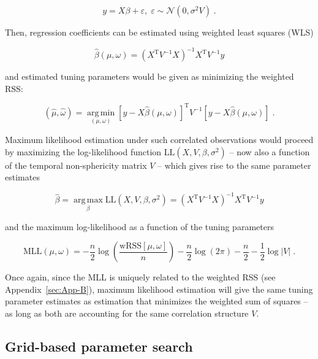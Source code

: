 \documentclass[a4paper,12pt]{article}
\begin{document}
\begin{equation} \label{eq:y-X-V}
y = X \beta + \varepsilon, \; \varepsilon \sim \mathcal{N}(0, \sigma^2 V) \; .
\end{equation}

Then, regression coefficients can be estimated using weighted least squares (WLS)

\begin{equation} \label{eq:b-est-X-V}
\hat{\beta}(\mu,\omega) = (X^\mathrm{T} V^{-1} X)^{-1} X^\mathrm{T} V^{-1} y
\end{equation}

and estimated tuning parameters would be given as minimizing the weighted RSS:

\begin{equation} \label{eq:mu-tw-est-X-V}
(\hat{\mu},\hat{\omega}) = \operatorname*{arg\,min}_{(\mu,\omega)} \left[ y - X \hat{\beta}(\mu,\omega) \right]^\mathrm{T} V^{-1} \left[ y - X \hat{\beta}(\mu,\omega) \right] \; .
\end{equation}

Maximum likelihood estimation under such correlated observations would proceed by maximizing the log-likelihood function $\mathrm{LL}(X,V,\beta,\sigma^2)$ -- now also a function of the temporal non-sphericity matrix $V$ -- which gives rise to the same parameter estimates

\begin{equation} \label{eq:MLE-V}
\hat{\beta} = \operatorname*{arg\,max}_{\beta} \mathrm{LL}(X,V,\beta,\sigma^2) = (X^\mathrm{T} V^{-1} X)^{-1} X^\mathrm{T} V^{-1} y
\end{equation}

and the maximum log-likelihood as a function of the tuning parameters

\begin{equation} \label{eq:MLL-V}
\mathrm{MLL}(\mu,\omega) = - \frac{n}{2} \log\left( \frac{\mathrm{wRSS}\left[ \mu, \omega \right]}{n} \right) - \frac{n}{2} \log(2\pi) - \frac{n}{2} - \frac{1}{2} \log|V| \; .
\end{equation}

Once again, since the MLL is uniquely related to the weighted RSS (see Appendix~\ref{sec:App-B}), maximum likelihood estimation will give the same tuning parameter estimates as estimation that minimizes the weighted sum of squares -- as long as both are accounting for the same correlation structure $V$.


\pagebreak
\subsection{Grid-based parameter search}
\end{document}
